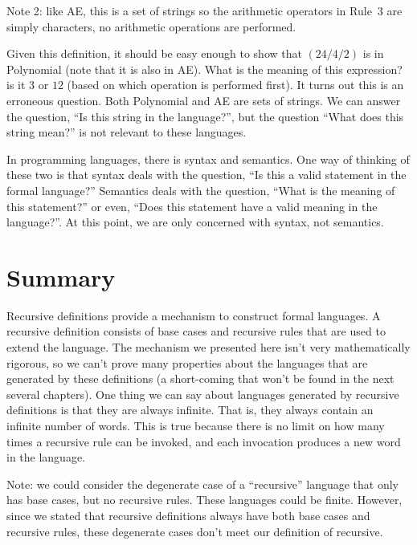 \documentclass[letterpaper,12pt,openany,reqno]{book}%
\begin{document}
Note 2: like AE, this is a set of strings so the arithmetic operators in Rule~3 are simply characters, no arithmetic operations are performed. 

Given this definition, it should be easy enough to show that $(24/4/2)$ is in Polynomial (note that it is also in AE). What is the meaning of this expression? is it $3$ or $12$ (based on which operation is performed first). It turns out this is an erroneous question. Both Polynomial and AE are sets of strings. We can answer the question, ``Is this string in the language?'', but the question ``What does this string mean?'' is not relevant to these languages.

In programming languages, there is syntax and semantics. One way of thinking of these two is that syntax deals with the question, ``Is this a valid statement in the formal language?'' Semantics deals with the question, ``What is the meaning of this statement?'' or even, ``Does this statement have a valid meaning in the language?''. At this point, we are only concerned with syntax, not semantics.

\section{Summary}
Recursive definitions provide a mechanism to construct formal languages. A recursive definition consists of base cases and recursive rules that are used to extend the language. The mechanism we presented here isn't very mathematically rigorous, so we can't prove many properties about the languages that are generated by these definitions (a short-coming that won't be found in the next several chapters). One thing we can say about languages generated by recursive definitions is that they are always infinite. That is, they always contain an infinite number of words. This is true because there is no limit on how many times a recursive rule can be invoked, and each invocation produces a new word in the language.

Note: we could consider the degenerate case of a ``recursive'' language that only has base cases, but no recursive rules. These languages could be finite. However, since we stated that recursive definitions always have both base cases and recursive rules, these degenerate cases don't meet our definition of recursive.
\end{document}
